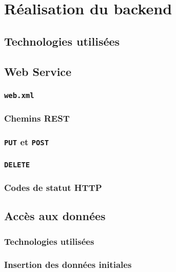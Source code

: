 
\section{Réalisation du backend}

\subsection{Technologies utilisées}

\subsection{Web Service}

\cprotect\subsubsection{\verb|web.xml|}

\subsubsection{Chemins REST}


\cprotect\subsubsection{\verb|PUT| et \verb|POST|}

\cprotect\subsubsection{\verb|DELETE|}

\subsubsection{Codes de statut HTTP}

\subsection{Accès aux données}

\subsubsection{Technologies utilisées}



\subsubsection{Insertion des données initiales}

